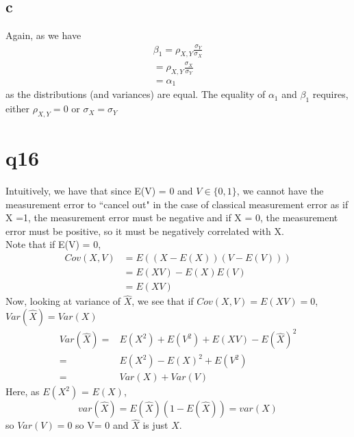 \documentclass[12pt]{paper}
\begin{document}
\subsection{c}
Again, as we have 
\begin{align*}
    \beta_1  = \rho_{X,Y} \frac{\sigma_Y}{\sigma_X} \\
    = \rho_{X,Y}\frac{\sigma_X}{\sigma_Y} \\
    = \alpha_1
\end{align*}
as the distributions (and variances) are equal. The equality of $\alpha_1$ and $\beta_1$ requires, either $\rho_{X,Y} = 0$ or $\sigma_X = \sigma_Y$

\section*{q16}
Intuitively, we have that since E(V) = 0 and $V\in \{0,1\}$, we cannot have the measurement error to ``cancel out" in the case of classical measurement error as if X =1, the measurement error must be negative and if X = 0, the measurement error must be positive, so it must be negatively correlated with X. \\
Note that if E(V) = 0,
\begin{align*}
Cov(X,V) &= E((X-E(X))(V-E(V))) \\
&= E(XV)-E(X)E(V) \\
& = E(XV)
\end{align*}
Now, looking at variance of $\hat X$, we see that if $Cov(X,V) = E(XV) = 0$, $Var(\hat X) = Var(X)$ 
\begin{align*}
Var(\hat X) =& E(X^2) + E(V^2) + E(XV) - E(\hat X)^2 \\
=& E(X^2) - E(X)^2 + E(V^2) \\
=& Var(X) + Var(V)
\end{align*}
Here, as $E(X^2)$ = $E(X)$, $$var(\hat X) = E(\hat X)(1-E(\hat X)) = var(X)$$ so $Var(V) = 0 $ so V= 0 and $\hat X $ is just $X$. 
\end{document}
